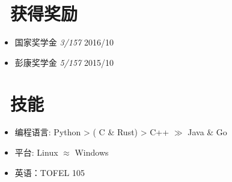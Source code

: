 \documentclass{resume}
\begin{document}
\section{\faHeartO\ 获得奖励}
\begin{itemize}
  \item 国家奖学金 \textit{3/157} \hfill 2016/10
  \item 彭康奖学金 \textit{5/157} \hfill 2015/10
\end{itemize}
\section{\faCogs\ 技能}
\begin{itemize}[parsep=0.5ex]
  \item 编程语言: Python > ( C \& Rust) > C++ $\gg$ Java \& Go
  \item 平台: Linux $\approx$ Windows
  \item 英语：TOFEL 105
\end{itemize}
\end{document}
